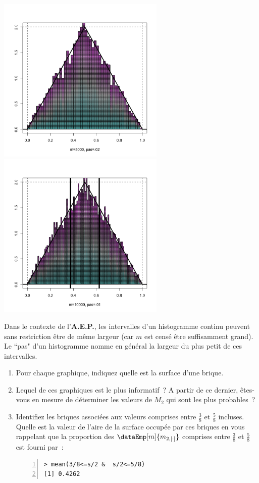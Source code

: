 \documentclass[10pt]{report}
\begin{document}
\begin{exercice}
\centerline{\includegraphics[width=8cm,height=8cm]{img/deuxUnif5000} \includegraphics[width=8cm,height=8cm]{img/deuxUnif10000}}
Dans le contexte de l'\textbf{A.E.P.}, les intervalles d'un histogramme continu peuvent sans restriction être de même largeur (car $m$ est censé être suffisamment grand). 
Le ``pas" d'un histogramme nomme en général la largeur du plus petit de ces intervalles.
\begin{enumerate}
\item Pour chaque graphique, indiquez quelle est la surface d'une brique.  
\item Lequel de ces graphiques est le plus informatif~? A partir de ce dernier, êtes-vous en mesure de déterminer les valeurs de $M_2$ qui sont les plus probables~?
\item  Identifiez les briques associées aux valeurs comprises entre $\frac38$ et $\frac58$ incluses. Quelle est la valeur de l'aire de la surface occupée par ces briques en vous rappelant que la proportion des $\dataEmp[m]{m_{2,[\cdot]}}$ comprises entre $\frac38$ et $\frac58$  est fourni par~:\\
\begin{Verbatim}[frame=leftline,fontfamily=tt,fontshape=n,numbers=left]
> mean(3/8<=s/2 &  s/2<=5/8)
[1] 0.4262
\end{Verbatim}


\end{enumerate}
\end{exercice}
\end{document}
